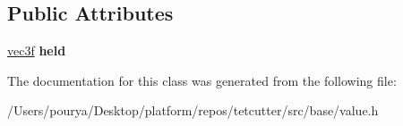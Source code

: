 \subsection*{Public Attributes}
\begin{DoxyCompactItemize}
\item 
\hypertarget{classps_1_1PRIVATE_1_1holder_3_01vec3f_01_4_a315bc8fcab0df0aff5d8a87e1c5c710c}{}\hyperlink{classps_1_1base_1_1Vec3}{vec3f} {\bfseries held}\label{classps_1_1PRIVATE_1_1holder_3_01vec3f_01_4_a315bc8fcab0df0aff5d8a87e1c5c710c}

\end{DoxyCompactItemize}


The documentation for this class was generated from the following file\+:\begin{DoxyCompactItemize}
\item 
/\+Users/pourya/\+Desktop/platform/repos/tetcutter/src/base/value.\+h\end{DoxyCompactItemize}
